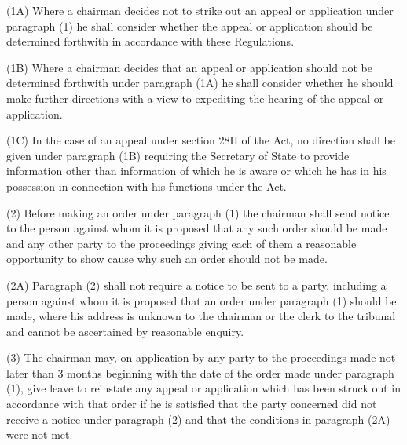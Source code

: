 \documentclass[12pt,a4paper]{article}
\begin{document}
(1A) Where a chairman decides not to strike out an appeal or application under paragraph (1) he shall consider whether the appeal or application should be determined forthwith in accordance with these Regulations.

(1B) Where a chairman decides that an appeal or application should not be determined forthwith under paragraph (1A) he shall consider whether he should make further directions with a view to expediting the hearing of the appeal or application.

(1C) In the case of an appeal under section 28H of the Act, no direction shall
be given under paragraph (1B) requiring the Secretary of State to provide
information other than information of which he is aware or which he has in his
possession in connection with his functions under the Act.

(2) Before making an order under paragraph (1) the chairman shall send notice to the person against whom it is proposed that any such order should be made and any other party to the proceedings giving each of them a reasonable opportunity to show cause why such an order should not be made.

(2A) Paragraph (2) shall not require a notice to be sent to a party, including a person against whom it is proposed that an order under paragraph (1) should be made, where his address is unknown to the chairman or the clerk to the tribunal and cannot be ascertained by reasonable enquiry.

(3) The chairman may, on application by any party to the proceedings made not later than 
3 months  %
beginning with the date of the order made under paragraph (1), give leave to reinstate any appeal or application which has been struck out in accordance with that order
if he is satisfied that the party concerned did not receive a notice under paragraph (2) and that the conditions in paragraph (2A) were not met.  %
\end{document}
